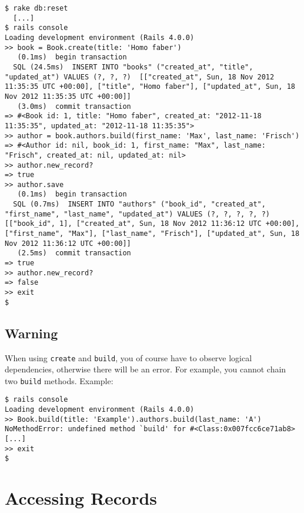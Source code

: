 \documentclass[a4paper]{book}
\begin{document}
\begin{shaded}\begin{verbatim}
$ rake db:reset
  [...]
$ rails console
Loading development environment (Rails 4.0.0)
>> book = Book.create(title: 'Homo faber')
   (0.1ms)  begin transaction
  SQL (24.5ms)  INSERT INTO "books" ("created_at", "title", "updated_at") VALUES (?, ?, ?)  [["created_at", Sun, 18 Nov 2012 11:35:35 UTC +00:00], ["title", "Homo faber"], ["updated_at", Sun, 18 Nov 2012 11:35:35 UTC +00:00]]
   (3.0ms)  commit transaction
=> #<Book id: 1, title: "Homo faber", created_at: "2012-11-18 11:35:35", updated_at: "2012-11-18 11:35:35">
>> author = book.authors.build(first_name: 'Max', last_name: 'Frisch')
=> #<Author id: nil, book_id: 1, first_name: "Max", last_name: "Frisch", created_at: nil, updated_at: nil>
>> author.new_record?
=> true
>> author.save
   (0.1ms)  begin transaction
  SQL (0.7ms)  INSERT INTO "authors" ("book_id", "created_at", "first_name", "last_name", "updated_at") VALUES (?, ?, ?, ?, ?)  [["book_id", 1], ["created_at", Sun, 18 Nov 2012 11:36:12 UTC +00:00], ["first_name", "Max"], ["last_name", "Frisch"], ["updated_at", Sun, 18 Nov 2012 11:36:12 UTC +00:00]]
   (2.5ms)  commit transaction
=> true
>> author.new_record?
=> false
>> exit
$
\end{verbatim}\end{shaded}

\subsection{Warning}\label{warning-2}

When using \texttt{create} and \texttt{build}, you of course have to observe logical dependencies, otherwise there will be an error. For example, you cannot chain two \texttt{build} methods. Example:

\begin{shaded}\begin{verbatim}
$ rails console
Loading development environment (Rails 4.0.0)
>> Book.build(title: 'Example').authors.build(last_name: 'A')
NoMethodError: undefined method `build' for #<Class:0x007fcc6ce71ab8>
[...]
>> exit
$
\end{verbatim}\end{shaded}

\section{Accessing Records}\label{accessing-records}
\end{document}
